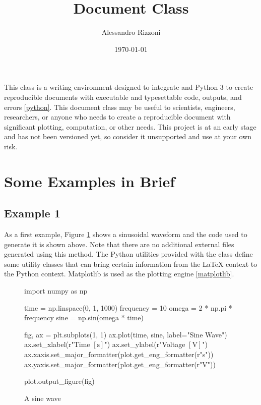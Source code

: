 \documentclass[12pt]{document}
\author{Alessandro Rizzoni}
\title{Document Class}
\date{\today}
\begin{document}
\maketitle

\begin{introduction}

  This class is a writing environment designed to integrate
  {\LuaLaTeX} and Python 3 to create
  reproducible documents with executable and typesettable code, outputs, and
  errors \ref{python}. This document class may be useful to
  scientists, engineers, researchers,
  or anyone who needs to create a reproducible document with
  significant plotting,
  computation, or other needs. This project is at an early stage and
  has not been
  versioned yet, so consider it unsupported and use at your own risk.

\end{introduction}

\section{Some Examples in Brief}

\subsection{Example 1}

As a first example, Figure \ref{fig:sine} shows a sinusoidal waveform
and the code used to generate it is shown above. Note that there are no additional external files
generated using this method. The Python utilities provided with the class define
some utility classes that can bring certain information from the LaTeX context
to the Python context. Matplotlib is used as the plotting engine
\ref{matplotlib}.

\begin{figure}[!ht]
  \begin{pycode}
    import numpy as np

    time = np.linspace(0, 1, 1000)
    frequency = 10
    omega = 2 * np.pi * frequency
    sine = np.sin(omega * time)

    fig, ax = plt.subplots(1, 1)
    ax.plot(time, sine, label="Sine Wave")
    ax.set_xlabel(r"Time $\left[\mathrm{s}\right]$")
    ax.set_ylabel(r"Voltage $\left[\mathrm{V}\right]$")
    ax.xaxis.set_major_formatter(plot.get_eng_formatter(r"s"))
    ax.yaxis.set_major_formatter(plot.get_eng_formatter(r"V"))

    plot.output_figure(fig)
  \end{pycode}
  \caption{A sine wave}\label{fig:sine}
\end{figure}
\end{document}
